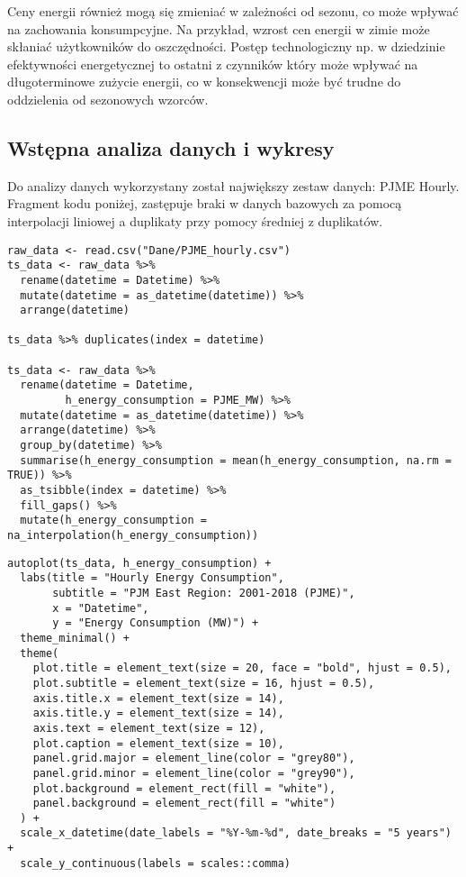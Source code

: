 \documentclass{article}
\begin{document}
 Ceny energii również mogą się zmieniać w zależności od sezonu, co może wpływać na zachowania konsumpcyjne. Na przykład, wzrost cen energii w zimie może skłaniać użytkowników do oszczędności.
 Postęp technologiczny  np. w dziedzinie efektywności energetycznej to ostatni z czynników który może wpływać na długoterminowe zużycie energii, co w konsekwencji może być trudne do oddzielenia od sezonowych wzorców.
 \newpage
 
 \subsection{Wstępna analiza danych i wykresy}
Do analizy danych wykorzystany został największy zestaw danych: PJME Hourly.
 Fragment kodu poniżej, zastępuje braki w danych bazowych za pomocą interpolacji liniowej a duplikaty przy pomocy średniej z duplikatów. 
\begin{lstlisting}[caption={Wczytanie plików z folderu dane i wstępna obróbka}]
raw_data <- read.csv("Dane/PJME_hourly.csv")
ts_data <- raw_data %>%
  rename(datetime = Datetime) %>%
  mutate(datetime = as_datetime(datetime)) %>%
  arrange(datetime)

ts_data %>% duplicates(index = datetime)

ts_data <- raw_data %>%
  rename(datetime = Datetime,
         h_energy_consumption = PJME_MW) %>%
  mutate(datetime = as_datetime(datetime)) %>%
  arrange(datetime) %>%
  group_by(datetime) %>% 
  summarise(h_energy_consumption = mean(h_energy_consumption, na.rm = TRUE)) %>%
  as_tsibble(index = datetime) %>%
  fill_gaps() %>% 
  mutate(h_energy_consumption = na_interpolation(h_energy_consumption))
\end{lstlisting}
 \newpage
\begin{lstlisting}[caption={Kod wywołujący wykres ogólny dla konsumpcji energii }]
autoplot(ts_data, h_energy_consumption) +
  labs(title = "Hourly Energy Consumption",
       subtitle = "PJM East Region: 2001-2018 (PJME)",
       x = "Datetime",
       y = "Energy Consumption (MW)") +
  theme_minimal() +
  theme(
    plot.title = element_text(size = 20, face = "bold", hjust = 0.5),
    plot.subtitle = element_text(size = 16, hjust = 0.5),
    axis.title.x = element_text(size = 14),
    axis.title.y = element_text(size = 14),
    axis.text = element_text(size = 12),
    plot.caption = element_text(size = 10),
    panel.grid.major = element_line(color = "grey80"),
    panel.grid.minor = element_line(color = "grey90"),
    plot.background = element_rect(fill = "white"),
    panel.background = element_rect(fill = "white")
  ) +
  scale_x_datetime(date_labels = "%Y-%m-%d", date_breaks = "5 years") +
  scale_y_continuous(labels = scales::comma)
\end{lstlisting}
\end{document}
